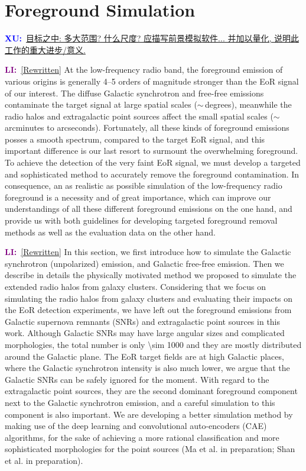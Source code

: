 \documentclass[modern]{aastex61}
\newcommand{\XU}[1]{\textcolor{blue}{\textbf{XU:}}~\uline{#1}}
\newcommand{\LI}[1]{\textcolor{purple}{\textbf{LI:}}~\uline{#1}}
\begin{document}

\section{Foreground Simulation}
\label{sec:fg-simu}

\XU{目标之中: 多大范围? 什么尺度? 应描写前景模拟软件... 并加以量化,
  说明此工作的重大进步/意义.}

\LI{[Rewritten]}
At the low-frequency radio band, the foreground emission of various
origins is generally \numrange{4}{5} orders of magnitude stronger
than the EoR signal of our interest.
The diffuse Galactic synchrotron and free-free emissions contaminate
the target signal at large spatial scales ($\sim\,$degrees),
meanwhile the radio halos and extragalactic point sources affect the
small spatial scales ($\sim\,$arcminutes to arcseconds).
Fortunately, all these kinds of foreground emissions posses a smooth
spectrum, compared to the target EoR signal, and this important
difference is our last resort to surmount the overwhelming foreground.
To achieve the detection of the very faint EoR signal, we must
develop a targeted and sophisticated method to accurately remove the
foreground contamination.
In consequence, an as realistic as possible simulation of the
low-frequency radio foreground is a necessity and of great importance,
which can improve our understandings of all these different foreground
emissions on the one hand, and provide us with both guidelines for
developing targeted foreground removal methods as well as the
evaluation data on the other hand.

\LI{[Rewritten]}
In this section, we first introduce how to simulate the Galactic
synchrotron (unpolarized) emission, and Galactic free-free emission.
Then we describe in details the physically motivated method we proposed
to simulate the extended radio halos from galaxy clusters.
Considering that we focus on simulating the radio halos from galaxy
clusters and evaluating their impacts on the EoR detection experiments,
we have left out the foreground emissions from Galactic supernova remnants
(SNRs) and extragalactic point sources in this work.
Although Galactic SNRs may have large angular sizes and complicated
morphologies, the total number is only \num{\sim 1000} \citep{li1991,anderson2017}
and they are mostly distributed around the Galactic plane.
The EoR target fields are at high Galactic places, where the
Galactic synchrotron intensity is also much lower, we argue that
the Galactic SNRs can be safely ignored for the moment.
With regard to the extragalactic point sources, they are the second
dominant foreground component next to the Galactic synchrotron emission,
and a careful simulation to this component is also important.
We are developing a better simulation method by making use of the
deep learning and convolutional auto-encoders (CAE) algorithms, for the
sake of achieving a more rational classification and more sophisticated
morphologies for the point sources
(Ma et al. in preparation; Shan et al. in preparation).
\end{document}
